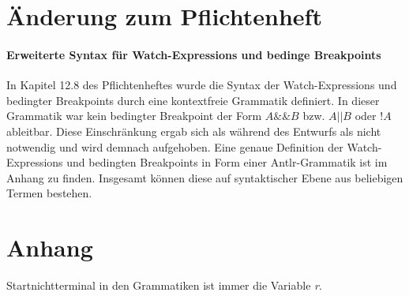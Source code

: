 \documentclass[parskip=full]{scrartcl}
\begin{document}
\section{Änderung zum Pflichtenheft}
\paragraph{Erweiterte Syntax für Watch-Expressions und bedinge Breakpoints}
In Kapitel 12.8 des Pflichtenheftes wurde die Syntax der Watch-Expressions und bedingter Breakpoints durch eine kontextfreie Grammatik definiert. 
In dieser Grammatik war kein bedingter Breakpoint der Form $A\&\&B$ bzw. $A||B$ oder $!A$ ableitbar. Diese Einschränkung ergab sich als während des Entwurfs als nicht notwendig und wird demnach aufgehoben. Eine genaue Definition der Watch-Expressions und bedingten Breakpoints in Form einer Antlr-Grammatik ist im Anhang zu finden. Insgesamt können diese auf syntaktischer Ebene aus beliebigen Termen bestehen. 




\section{Anhang}

Startnichtterminal in den Grammatiken ist immer die Variable \textit{r}.
\end{document}
